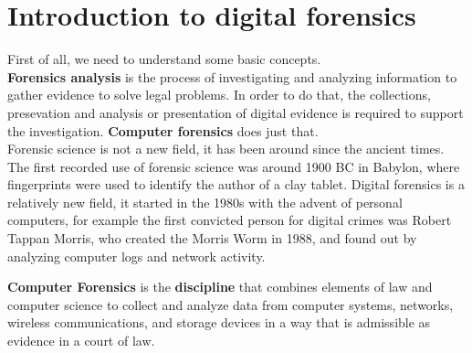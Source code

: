 \chapter{Introduction to digital forensics}
First of all, we need to understand some basic concepts. \\
\textbf{Forensics analysis} is the process of investigating and
analyzing information to gather evidence to solve legal problems. In
order to do that, the collections, presevation and analysis or
presentation of digital evidence is required to support the
investigation. \textbf{Computer forensics} does just that.\\
Forensic science is not a new field, it has been around since the
ancient times. The first recorded use of forensic science was around
1900 BC in Babylon, where fingerprints were used to identify the 
author of a clay tablet. Digital forensics is a relatively new field,
it started in the 1980s with the advent of personal computers, for
example the first convicted person for digital crimes was Robert
Tappan Morris, who created the Morris Worm in 1988, and found out by
analyzing computer logs and network activity.
\begin{boxH}
  \textbf{Computer Forensics} is the \textbf{discipline} that combines elements
  of law and computer science to collect and analyze data from computer
  systems, networks, wireless communications, and storage devices in a way that
  is admissible as evidence in a court of law.
\end{boxH}
